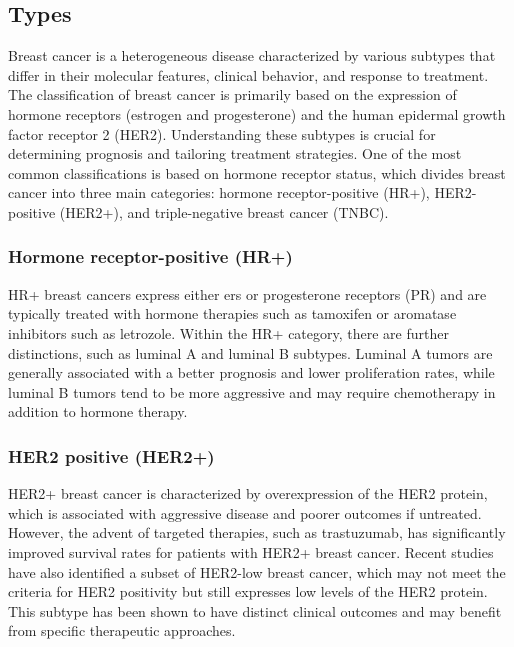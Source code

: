 \subsection{Types}
\label{sec:brca_types}

Breast cancer is a heterogeneous disease characterized by various subtypes that
differ in their molecular features, clinical behavior, and response to
treatment\supercite{harbeck_breast_2019}.
The classification of breast cancer is primarily based on the expression of
hormone receptors (estrogen and progesterone) and the human epidermal growth
factor receptor 2 (HER2).
Understanding these subtypes is crucial for determining prognosis and tailoring
treatment strategies.
One of the most common classifications is based on hormone receptor status,
which divides breast cancer into three main categories: hormone
receptor-positive (HR+), HER2-positive (HER2+), and triple-negative breast
cancer (TNBC)\supercite{clusan_basic_2023}.

\subsubsection{Hormone receptor-positive (HR+)}
HR+ breast cancers express either \glspl{er} or progesterone receptors (PR) and
are typically treated with hormone therapies such as tamoxifen or aromatase
inhibitors such as letrozole\supercite{geyer_molecular_2012}.
Within the HR+ category, there are further distinctions, such as luminal A and
luminal B subtypes.
Luminal A tumors are generally associated with a better prognosis and lower
proliferation rates, while luminal B tumors tend to be more aggressive and may
require chemotherapy in addition to hormone
therapy\supercite{geyer_molecular_2012}.

\subsubsection{HER2 positive (HER2+)}
HER2+ breast cancer is characterized by overexpression of the HER2 protein,
which is associated with aggressive disease and poorer outcomes if untreated.
However, the advent of targeted therapies, such as trastuzumab, has
significantly improved survival rates for patients with HER2+ breast
cancer\supercite{modi_antitumor_2020}.
Recent studies have also identified a subset of HER2-low breast cancer, which
may not meet the criteria for HER2 positivity but still expresses low levels of
the HER2 protein.
This subtype has been shown to have distinct clinical outcomes and may benefit
from specific therapeutic
approaches\supercite{won_clinical_2022,mutai_prognostic_2021}.


